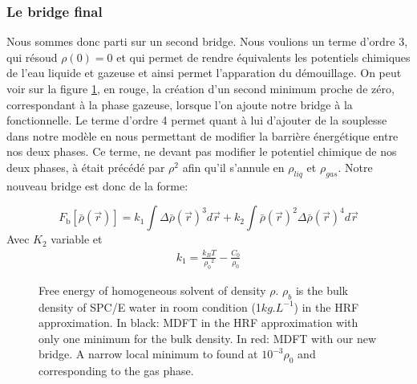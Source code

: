 \subsubsection{Le bridge final}

Nous sommes donc parti sur un second bridge. Nous voulions un terme d'ordre 3, qui résoud $\rho(0)=0$ et qui permet de rendre équivalents les potentiels chimiques de l'eau liquide et gazeuse et ainsi permet l'apparation du démouillage. On peut voir sur la figure \ref{fig:fonctionelle}, en rouge, la création d'un second minimum proche de zéro, correspondant à la phase gazeuse, lorsque l'on ajoute notre bridge à la fonctionnelle. Le terme d'ordre 4 permet quant à lui d'ajouter de la souplesse dans notre modèle en nous permettant de modifier la barrière énergétique entre nos deux phases. Ce terme, ne devant pas modifier le potentiel chimique de nos deux phases, à était précédé par $\rho^2$ afin qu'il s'annule en  $\rho_{liq}$ et $\rho_{gas}$. Notre nouveau bridge est donc de la forme:

\begin{equation} \label{eq:fbridge_2}
F_{\mathrm{b}}[\bar{\rho}(\vec{r})]=k_1\int\Delta\bar{\rho}(\vec{r})^3d\vec{r}+k_2\int\bar{\rho}(\vec{r})^2\Delta\bar{\rho}(\vec{r})^4d\vec{r}
\end{equation}
Avec $K_2$ variable et
\begin{eqnarray} \label{eq:bridge_parameter_2}
k_1 = \frac{k_{B}T}{{\rho_0}^2}-\frac{C_0}{\rho_0}
\end{eqnarray}



\begin{figure}
    \center
    
    \caption{Free energy of homogeneous solvent of density $\rho$. $\rho_b$ is the bulk density of SPC/E water in room condition (1$kg.L^{-1}$) in the HRF approximation. In black: MDFT in the HRF approximation with only one minimum for the bulk density. In red: MDFT with our new bridge. A narrow local minimum to found at $10^{-3} \rho_0$ and corresponding to the gas phase.}
    \label{fig:fonctionelle}
\end{figure}



